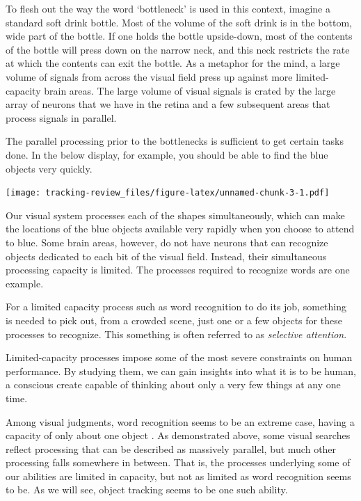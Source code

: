 \documentclass[
]{book}
\begin{document}
To flesh out the way the word `bottleneck' is used in this context, imagine a standard soft drink bottle. Most of the volume of the soft drink is in the bottom, wide part of the bottle. If one holds the bottle upside-down, most of the contents of the bottle will press down on the narrow neck, and this neck restricts the rate at which the contents can exit the bottle. As a metaphor for the mind, a large volume of signals from across the visual field press up against more limited-capacity brain areas. The large volume of visual signals is crated by the large array of neurons that we have in the retina and a few subsequent areas that process signals in parallel.

The parallel processing prior to the bottlenecks is sufficient to get certain tasks done. In the below display, for example, you should be able to find the blue objects very quickly.

\texttt{[image: tracking-review\_files/figure-latex/unnamed-chunk-3-1.pdf]}

Our visual system processes each of the shapes simultaneously, which can make the locations of the blue objects available very rapidly when you choose to attend to blue. Some brain areas, however, do not have neurons that can recognize objects dedicated to each bit of the visual field. Instead, their simultaneous processing capacity is limited. The processes required to recognize words are one example.

For a limited capacity process such as word recognition to do its job, something is needed to pick out, from a crowded scene, just one or a few objects for these processes to recognize. This something is often referred to as \emph{selective attention}.

Limited-capacity processes impose some of the most severe constraints on human performance. By studying them, we can gain insights into what it is to be human, a conscious create capable of thinking about only a very few things at any one time.

Among visual judgments, word recognition seems to be an extreme case, having a capacity of only about one object \citep{whiteVisualWordRecognition2020}. As demonstrated above, some visual searches reflect processing that can be described as massively parallel, but much other processing falls somewhere in between. That is, the processes underlying some of our abilities are limited in capacity, but not as limited as word recognition seems to be. As we will see, object tracking seems to be one such ability.
\end{document}
